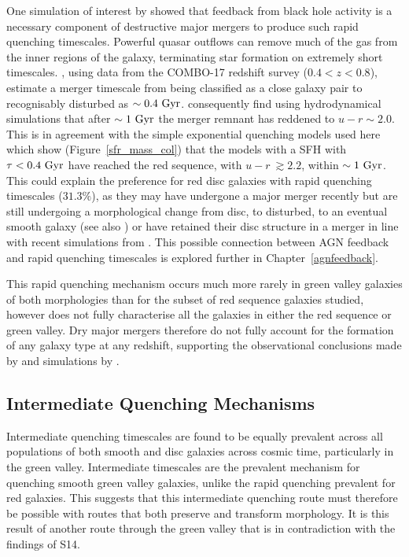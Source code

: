 One simulation of interest by \citet{springel05b} showed that feedback from black hole activity is a necessary component of destructive major mergers to produce such rapid quenching timescales. Powerful quasar outflows can remove much of the gas from the inner regions of the galaxy, terminating star formation on extremely short timescales. \citet{Bell06}, using data from the COMBO-17 redshift survey ($0.4 < z < 0.8$), estimate a merger timescale from being classified as a close galaxy pair to recognisably disturbed as $\sim 0.4~\rm{Gyr}$. \citet{springel05b} consequently find using hydrodynamical simulations that after $\sim1~\rm{Gyr}$ the merger remnant has reddened to $u-r \sim 2.0$. This is in agreement with the simple exponential quenching models used here which show (Figure~\ref{sfr_mass_col}) that the models with a SFH with $\tau < 0.4~\rm{Gyr}$ have reached the red sequence, with $u-r ~\gtrsim 2.2$, within $\sim1~\rm{Gyr}$. This could explain the preference for red disc galaxies with rapid quenching timescales ($31.3\%$), as they may have undergone a major merger recently but are still undergoing a morphological change from disc, to disturbed, to an eventual smooth galaxy (see also \citealt{vdW09}) or have retained their disc structure in a merger in line with recent simulations from \citet{pontzen16}. This possible connection between AGN feedback and rapid quenching timescales is explored further in Chapter~\ref{agnfeedback}. 

This rapid quenching mechanism occurs much more rarely in green valley galaxies of both morphologies than for the subset of red sequence galaxies studied, however does not fully characterise all the galaxies in either the red sequence or green valley. Dry major mergers therefore do not fully account for the formation of any galaxy type at any redshift, supporting the observational conclusions made by \citet{Bell07,Bundy07, kaviraj14a} and simulations by \citet{Genel08}. 

\subsection{Intermediate Quenching Mechanisms}\label{int}

Intermediate quenching timescales are found to be equally prevalent across  all populations of both smooth and disc galaxies across cosmic time,  particularly in the green valley. Intermediate timescales are the prevalent mechanism for quenching smooth green valley galaxies, unlike the rapid quenching prevalent for red galaxies. This suggests that this intermediate quenching route must therefore be possible with routes that both preserve and transform morphology. It is this result of another route through the green valley that is in contradiction with the findings of S14. 

